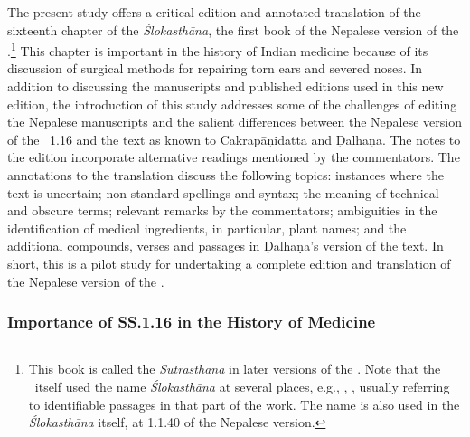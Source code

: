 The present study offers a critical edition and annotated translation of the
sixteenth chapter of the \emph{Ślokasthāna}, the first book of the Nepalese
version of the \SS.\footnote{This book is called the \emph{Sūtrasthāna} in later
    versions of the \SS.  Note that the \SS\ itself used the name \emph{Ślokasthāna}
    at several places, e.g., , , usually
    referring to identifiable passages in that part of the work. The name is also used
    in the \emph{Ślokasthāna} itself, at 1.1.40 of the Nepalese version.} 
%  
This chapter is important in the history of Indian medicine because of its
discussion of surgical methods for repairing torn ears and severed noses. In
addition to discussing the manuscripts and published editions used in this new
edition, the introduction of this study addresses some of the challenges of
editing the Nepalese manuscripts and the salient differences between the Nepalese
version of the \SS\ 1.16 and the text as known to Cakrapāṇidatta and Ḍalhaṇa. The
notes to the edition incorporate alternative readings mentioned by the
commentators.  The annotations to the translation discuss the following topics:
instances where the text is uncertain; non-standard spellings and syntax; the
meaning of technical and obscure terms; relevant remarks by the commentators;
ambiguities in the identification of medical ingredients, in particular, plant
names; and the additional compounds, verses and passages in Ḍalhaṇa's version of
the text. In short, this is a pilot study for undertaking a complete edition and
translation of the Nepalese version of the \SS.


\subsubsection{Importance of SS.1.16 in the History of Medicine}


